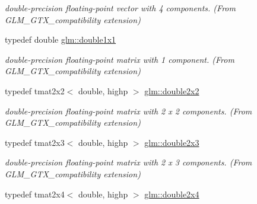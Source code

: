 \begin{DoxyCompactItemize}
\begin{DoxyCompactList}\small\item\em double-\/precision floating-\/point vector with 4 components. (From G\-L\-M\-\_\-\-G\-T\-X\-\_\-compatibility extension) \end{DoxyCompactList}\item 
\hypertarget{group__gtx__compatibility_ga1c87d3042377335eb050a20ab0ec148a}{typedef double \hyperlink{group__gtx__compatibility_ga1c87d3042377335eb050a20ab0ec148a}{glm\-::double1x1}}\label{group__gtx__compatibility_ga1c87d3042377335eb050a20ab0ec148a}

\begin{DoxyCompactList}\small\item\em double-\/precision floating-\/point matrix with 1 component. (From G\-L\-M\-\_\-\-G\-T\-X\-\_\-compatibility extension) \end{DoxyCompactList}\item 
\hypertarget{group__gtx__compatibility_ga7651d80f2dcc222a2e229ce44af96f11}{typedef tmat2x2$<$ double, highp $>$ \hyperlink{group__gtx__compatibility_ga7651d80f2dcc222a2e229ce44af96f11}{glm\-::double2x2}}\label{group__gtx__compatibility_ga7651d80f2dcc222a2e229ce44af96f11}

\begin{DoxyCompactList}\small\item\em double-\/precision floating-\/point matrix with 2 x 2 components. (From G\-L\-M\-\_\-\-G\-T\-X\-\_\-compatibility extension) \end{DoxyCompactList}\item 
\hypertarget{group__gtx__compatibility_ga60ae0f5858d498b2e5b9bb8d23019db0}{typedef tmat2x3$<$ double, highp $>$ \hyperlink{group__gtx__compatibility_ga60ae0f5858d498b2e5b9bb8d23019db0}{glm\-::double2x3}}\label{group__gtx__compatibility_ga60ae0f5858d498b2e5b9bb8d23019db0}

\begin{DoxyCompactList}\small\item\em double-\/precision floating-\/point matrix with 2 x 3 components. (From G\-L\-M\-\_\-\-G\-T\-X\-\_\-compatibility extension) \end{DoxyCompactList}\item 
\hypertarget{group__gtx__compatibility_gadb90656f5faac0e800718a0a19bf0e03}{typedef tmat2x4$<$ double, highp $>$ \hyperlink{group__gtx__compatibility_gadb90656f5faac0e800718a0a19bf0e03}{glm\-::double2x4}}\label{group__gtx__compatibility_gadb90656f5faac0e800718a0a19bf0e03}


\end{DoxyCompactItemize}
